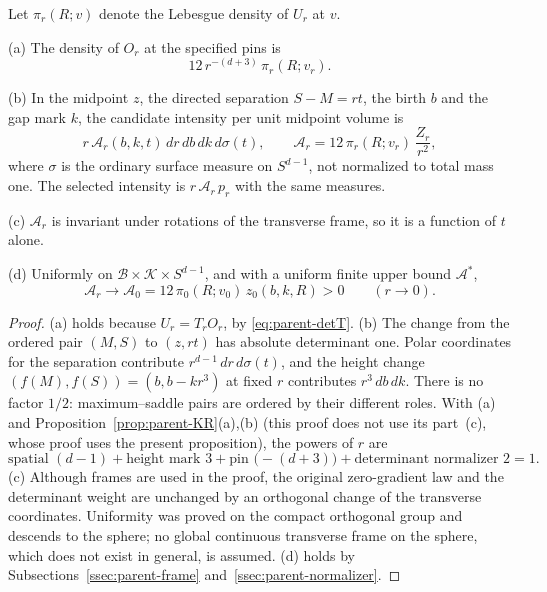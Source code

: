 \begin{proposition}\label{prop:parent-ledger}
Let $\pi_r(R;v)$ denote the Lebesgue density of $U_r$ at $v$.

\textup{(a)} The density of $O_r$ at the specified pins is
\begin{equation}\label{eq:parent-101}
12\,r^{-(d+3)}\,\pi_r(R;v_r).
\end{equation}

\textup{(b)} In the midpoint $z$, the directed separation $S-M=rt$, the birth $b$ and the gap mark $k$, the candidate intensity per unit midpoint volume is
\begin{equation}\label{eq:parent-102}
r\,\mathcal A_r(b,k,t)\,dr\,db\,dk\,d\sigma(t),\qquad \mathcal A_r=12\,\pi_r(R;v_r)\,\frac{Z_r}{r^2},
\end{equation}
where $\sigma$ is the ordinary surface measure on $S^{d-1}$, not normalized to total mass one. The selected intensity is $r\,\mathcal A_r\,p_r$ with the same measures.

\textup{(c)} $\mathcal A_r$ is invariant under rotations of the transverse frame, so it is a function of $t$ alone.

\textup{(d)} Uniformly on $\mathcal B\times\mathcal K\times S^{d-1}$, and with a uniform finite upper bound $\mathcal A^*$,
\begin{equation}\label{eq:parent-103}
\mathcal A_r\longrightarrow\mathcal A_0=12\,\pi_0(R;v_0)\,z_0(b,k,R)>0\qquad(r\to0).
\end{equation}
\end{proposition}

\begin{proof}
(a) holds because $U_r=T_rO_r$, by \eqref{eq:parent-detT}. (b) The change from the ordered pair $(M,S)$ to $(z,rt)$ has absolute determinant one. Polar coordinates for the separation contribute $r^{d-1}\,dr\,d\sigma(t)$, and the height change $(f(M),f(S))=(b,b-kr^3)$ at fixed $r$ contributes $r^3\,db\,dk$. There is no factor $1/2$: maximum--saddle pairs are ordered by their different roles. With (a) and Proposition~\ref{prop:parent-KR}(a),(b) (this proof does not use its part~(c), whose proof uses the present proposition), the powers of $r$ are
\[
\text{spatial }(d-1)+\text{height mark }3+\text{pin }\bigl(-(d+3)\bigr)+\text{determinant normalizer }2=1 .
\]
(c) Although frames are used in the proof, the original zero-gradient law and the determinant weight are unchanged by an orthogonal change of the transverse coordinates. Uniformity was proved on the compact orthogonal group and descends to the sphere; no global continuous transverse frame on the sphere, which does not exist in general, is assumed. (d) holds by Subsections~\ref{ssec:parent-frame} and~\ref{ssec:parent-normalizer}.
\end{proof}

